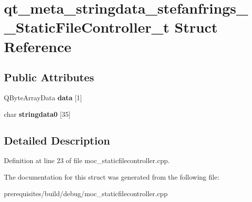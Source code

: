 \hypertarget{structqt__meta__stringdata__stefanfrings_____static_file_controller__t}{}\section{qt\+\_\+meta\+\_\+stringdata\+\_\+stefanfrings\+\_\+\+\_\+\+Static\+File\+Controller\+\_\+t Struct Reference}
\label{structqt__meta__stringdata__stefanfrings_____static_file_controller__t}
\subsection*{Public Attributes}
\begin{DoxyCompactItemize}
\item 
\mbox{\label{structqt__meta__stringdata__stefanfrings_____static_file_controller__t_ae29bb0cbeb6fa8d6810808e2b29caefd}} 
Q\+Byte\+Array\+Data {\bfseries data} \mbox{[}1\mbox{]}
\item 
\mbox{\label{structqt__meta__stringdata__stefanfrings_____static_file_controller__t_a86092dabe88d69ee4d64382f77c2b386}} 
char {\bfseries stringdata0} \mbox{[}35\mbox{]}
\end{DoxyCompactItemize}


\subsection{Detailed Description}


Definition at line 23 of file moc\+\_\+staticfilecontroller.\+cpp.



The documentation for this struct was generated from the following file\+:\begin{DoxyCompactItemize}
\item 
prerequisites/build/debug/moc\+\_\+staticfilecontroller.\+cpp\end{DoxyCompactItemize}
